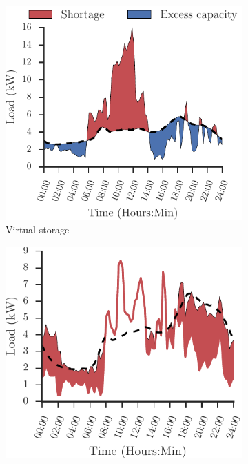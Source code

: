\documentclass[conference]{IEEEtran}
\begin{document}
\begin{figure}[t!]
\centering
	\begin{subfigure}[b]{0.45\columnwidth}
	\includegraphics[width=1.1\textwidth, clip=true, trim=0 0 0 0.6cm]{figures/slp_shortage.pdf}
        \caption{Virtual storage}
        \label{fig:shortage}
    \end{subfigure}
    \begin{subfigure}[b]{0.45\columnwidth}
    \includegraphics[width=1.0\textwidth]{figures/movable.pdf}

\end{subfigure}
\end{figure}
\end{document}
